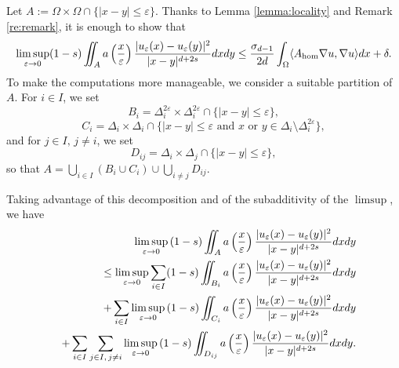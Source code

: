\documentclass[11pt,a4paper,reqno]{amsart}
\theoremstyle{plain}
\theoremstyle{definition}
\newcommand\e{\varepsilon}
\newcommand\Om{\Omega}
\newcommand\Omid{\Delta_i^{2\varepsilon}}
\theoremstyle{remark}
\begin{document}
Let $A:={\Om\times\Om\cap\{\lvert x-y\rvert\leq \e\}}$. Thanks to Lemma \ref{lemma:locality} and Remark \ref{re:remark}, it is enough to show that 
\begin{equation} \nonumber 
\limsup_{\e\to 0}(1-s)\iint_A a\left(\frac{x}{\e}\right)\frac{\lvert u_\e(x)-u_\e(y)\rvert^2}{\lvert x-y\rvert^{d+2s}}dxdy\leq \frac{\sigma_{d-1}}{2d}\int_{\Om} \langle A_{\rm hom}\nabla{u},\nabla{u}\rangle dx+\delta.
\end{equation}
To make the computations more manageable, we consider a suitable partition of $A$. For $i\in I$, we set
\begin{equation*}
B_i =\Omid\times\Omid\cap\{\lvert x-y\rvert \leq \e\},
\end{equation*}
\begin{equation*}
C_i = \Delta_i\times\Delta_i\cap\{\lvert x-y\rvert\leq \e \text{ and } x \text{ or }y\in \Delta_i\setminus{\Omid}\},
\end{equation*} 
and for $j \in I,\, j \neq i$, we set
\[
D_{ij}=\Delta_i\times\Delta_j\cap\{\lvert x-y\rvert \leq \e\},
\]
so that $A=\bigcup_{i\in I}(B_i\cup C_i)\cup \bigcup_{i\neq j}D_{ij}$.

Taking advantage of this decomposition and of the subadditivity of the $\limsup$, we have
\begin{eqnarray}
&& \nonumber\hskip-2cm \limsup_{\e\to 0}\, (1-s)\iint_A a\left(\frac{x}{\e}\right)\frac{\lvert u_\e(x)-u_\e(y)\rvert^2}{\lvert x-y\rvert^{d+2s}}dxdy\\
&&\label{eq:FunctionalonBi} \leq  \limsup_{\e\to 0}\sum_{i\in I}(1-s)\iint_{B_i} a\left(\frac{x}{\e}\right)\frac{\lvert u_\e(x)-u_\e(y)\rvert^2}{\lvert x-y\rvert^{d+2s}}dxdy\\
&&\label{eq:FunctionalonCi} +\sum_{i\in I}\limsup_{\e\to 0}\,(1-s)\iint_{C_i} a\left(\frac{x}{\e}\right)\frac{\lvert u_\e(x)-u_\e(y)\rvert^2}{\lvert x-y\rvert^{d+2s}}dxdy\\ 
&& \label{eq:FunctionalonDij} +\sum_{i\in I}\sum_{j\in I,\, j\neq i}\limsup_{\e\to 0}\,(1-s)\iint_{D_{ij}} a\left(\frac{x}{\e}\right)\frac{\lvert u_\e(x)-u_\e(y)\rvert^2}{\lvert x-y\rvert^{d+2s}}dxdy.
\end{eqnarray}
\end{document}
